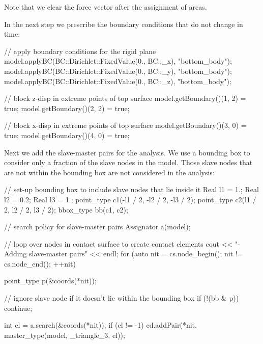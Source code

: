Note that we clear the force vector after the assignment of areas.

In the next step we prescribe the boundary conditions that do not change in time:

\begin{cpp}

  // apply boundary conditions for the rigid plane
  model.applyBC(BC::Dirichlet::FixedValue(0., BC::_x), "bottom_body");
  model.applyBC(BC::Dirichlet::FixedValue(0., BC::_y), "bottom_body");
  model.applyBC(BC::Dirichlet::FixedValue(0., BC::_z), "bottom_body");

  // block z-disp in extreme points of top surface
  model.getBoundary()(1, 2) = true;
  model.getBoundary()(2, 2) = true;

  // block x-disp in extreme points of top surface
  model.getBoundary()(3, 0) = true;
  model.getBoundary()(4, 0) = true;

\end{cpp}


Next we add the slave-master pairs for the analysis. We use a bounding box to consider only a fraction of the slave nodes in the model. Those slave nodes that are not within the bounding box are not considered in the analysis:
\begin{cpp}

  // set-up bounding box to include slave nodes that lie inside it
  Real l1 = 1.;
  Real l2 = 0.2;
  Real l3 = 1.;
  point_type c1(-l1 / 2, -l2 / 2, -l3 / 2);
  point_type c2(l1 / 2,  l2 / 2,  l3 / 2);
  bbox_type bb(c1, c2);

  // search policy for slave-master pairs
  Assignator a(model);


  // loop over nodes in contact surface to create contact elements
  cout << "- Adding slave-master pairs" << endl;
  for (auto nit = cs.node_begin(); nit != cs.node_end(); ++nit) {
    point_type p(&coords(*nit));

    // ignore slave node if it doesn't lie within the bounding box
    if (!(bb & p))
      continue;

    int el = a.search(&coords(*nit));
    if (el != -1)
      cd.addPair(*nit, master_type(model, _triangle_3, el));
  }
\end{cpp}


